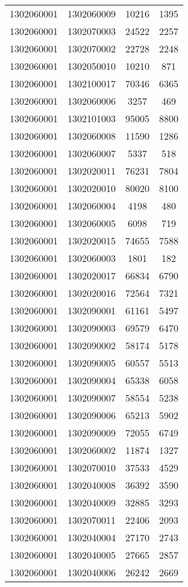 \begin{longtable}{llcc}
1302060001 & 1302060009 & 10216 & 1395\\
1302060001 & 1302070003 & 24522 & 2257\\
1302060001 & 1302070002 & 22728 & 2248\\
1302060001 & 1302050010 & 10210 & 871\\
1302060001 & 1302100017 & 70346 & 6365\\
1302060001 & 1302060006 & 3257 & 469\\
1302060001 & 1302101003 & 95005 & 8800\\
1302060001 & 1302060008 & 11590 & 1286\\
1302060001 & 1302060007 & 5337 & 518\\
1302060001 & 1302020011 & 76231 & 7804\\
1302060001 & 1302020010 & 80020 & 8100\\
1302060001 & 1302060004 & 4198 & 480\\
1302060001 & 1302060005 & 6098 & 719\\
1302060001 & 1302020015 & 74655 & 7588\\
1302060001 & 1302060003 & 1801 & 182\\
1302060001 & 1302020017 & 66834 & 6790\\
1302060001 & 1302020016 & 72564 & 7321\\
1302060001 & 1302090001 & 61161 & 5497\\
1302060001 & 1302090003 & 69579 & 6470\\
1302060001 & 1302090002 & 58174 & 5178\\
1302060001 & 1302090005 & 60557 & 5513\\
1302060001 & 1302090004 & 65338 & 6058\\
1302060001 & 1302090007 & 58554 & 5238\\
1302060001 & 1302090006 & 65213 & 5902\\
1302060001 & 1302090009 & 72055 & 6749\\
1302060001 & 1302060002 & 11874 & 1327\\
1302060001 & 1302070010 & 37533 & 4529\\
1302060001 & 1302040008 & 36392 & 3590\\
1302060001 & 1302040009 & 32885 & 3293\\
1302060001 & 1302070011 & 22406 & 2093\\
1302060001 & 1302040004 & 27170 & 2743\\
1302060001 & 1302040005 & 27665 & 2857\\
1302060001 & 1302040006 & 26242 & 2669\\

\end{longtable}
